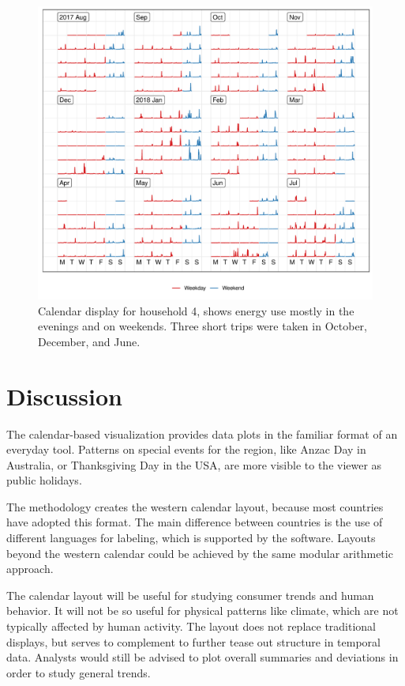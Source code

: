 \documentclass[12pt]{article}
\begin{document}
\begin{figure}

{\centering \includegraphics[width=\textwidth]{figure/h4-1} 

}

\caption{Calendar display for household 4, shows energy use mostly in the evenings and on weekends. Three short trips were taken in October, December, and June.}\label{fig:h4}
\end{figure}

\hypertarget{discussion}{%
\section{Discussion}\label{discussion}}

\label{sec:discussion}

The calendar-based visualization provides data plots in the familiar
format of an everyday tool. Patterns on special events for the region,
like Anzac Day in Australia, or Thanksgiving Day in the USA, are more
visible to the viewer as public holidays.

The methodology creates the western calendar layout, because most
countries have adopted this format. The main difference between
countries is the use of different languages for labeling, which is
supported by the software. Layouts beyond the western calendar could be
achieved by the same modular arithmetic approach.

The calendar layout will be useful for studying consumer trends and
human behavior. It will not be so useful for physical patterns like
climate, which are not typically affected by human activity. The layout
does not replace traditional displays, but serves to complement to
further tease out structure in temporal data. Analysts would still be
advised to plot overall summaries and deviations in order to study
general trends.
\end{document}
